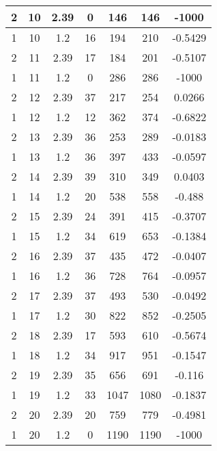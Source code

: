 \documentclass[letterpaper, 12pt]{article}
\begin{document}
\begin{longtable}{|c|c|c|c|c|c|c|}
\hline
2 & 10 & 2.39 & 0 & 146 & 146 & -1000 \\
\hline
1 & 10 & 1.2 & 16 & 194 & 210 & -0.5429 \\
\hline
2 & 11 & 2.39 & 17 & 184 & 201 & -0.5107 \\
\hline
1 & 11 & 1.2 & 0 & 286 & 286 & -1000 \\
\hline
2 & 12 & 2.39 & 37 & 217 & 254 & 0.0266 \\
\hline
1 & 12 & 1.2 & 12 & 362 & 374 & -0.6822 \\
\hline
2 & 13 & 2.39 & 36 & 253 & 289 & -0.0183 \\
\hline
1 & 13 & 1.2 & 36 & 397 & 433 & -0.0597 \\
\hline
2 & 14 & 2.39 & 39 & 310 & 349 & 0.0403 \\
\hline
1 & 14 & 1.2 & 20 & 538 & 558 & -0.488 \\
\hline
2 & 15 & 2.39 & 24 & 391 & 415 & -0.3707 \\
\hline
1 & 15 & 1.2 & 34 & 619 & 653 & -0.1384 \\
\hline
2 & 16 & 2.39 & 37 & 435 & 472 & -0.0407 \\
\hline
1 & 16 & 1.2 & 36 & 728 & 764 & -0.0957 \\
\hline
2 & 17 & 2.39 & 37 & 493 & 530 & -0.0492 \\
\hline
1 & 17 & 1.2 & 30 & 822 & 852 & -0.2505 \\
\hline
2 & 18 & 2.39 & 17 & 593 & 610 & -0.5674 \\
\hline
1 & 18 & 1.2 & 34 & 917 & 951 & -0.1547 \\
\hline
2 & 19 & 2.39 & 35 & 656 & 691 & -0.116 \\
\hline
1 & 19 & 1.2 & 33 & 1047 & 1080 & -0.1837 \\
\hline
2 & 20 & 2.39 & 20 & 759 & 779 & -0.4981 \\
\hline
1 & 20 & 1.2 & 0 & 1190 & 1190 & -1000 \\
\hline
\end{longtable}
\end{document}
